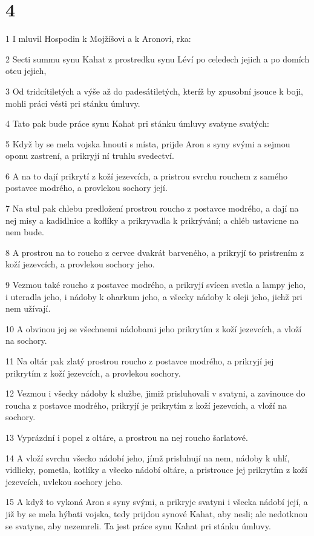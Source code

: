 \chapter{4}

\par 1 I mluvil Hospodin k Mojžíšovi a k Aronovi, rka:
\par 2 Secti summu synu Kahat z prostredku synu Léví po celedech jejich a po domích otcu jejich,
\par 3 Od tridcítiletých a výše až do padesátiletých, kteríž by zpusobní jsouce k boji, mohli práci vésti pri stánku úmluvy.
\par 4 Tato pak bude práce synu Kahat pri stánku úmluvy svatyne svatých:
\par 5 Když by se mela vojska hnouti s místa, prijde Aron s syny svými a sejmou oponu zastrení, a prikryjí ní truhlu svedectví.
\par 6 A na to dají prikrytí z koží jezevcích, a pristrou svrchu rouchem z samého postavce modrého, a provlekou sochory její.
\par 7 Na stul pak chlebu predložení prostrou roucho z postavce modrého, a dají na nej misy a kadidlnice a koflíky a prikryvadla k prikrývání; a chléb ustavicne na nem bude.
\par 8 A prostrou na to roucho z cervce dvakrát barveného, a prikryjí to pristrením z koží jezevcích, a provlekou sochory jeho.
\par 9 Vezmou také roucho z postavce modrého, a prikryjí svícen svetla a lampy jeho, i uteradla jeho, i nádoby k oharkum jeho, a všecky nádoby k oleji jeho, jichž pri nem užívají.
\par 10 A obvinou jej se všechnemi nádobami jeho prikrytím z koží jezevcích, a vloží na sochory.
\par 11 Na oltár pak zlatý prostrou roucho z postavce modrého, a prikryjí jej prikrytím z koží jezevcích, a provlekou sochory.
\par 12 Vezmou i všecky nádoby k službe, jimiž prisluhovali v svatyni, a zavinouce do roucha z postavce modrého, prikryjí je prikrytím z koží jezevcích, a vloží na sochory.
\par 13 Vyprázdní i popel z oltáre, a prostrou na nej roucho šarlatové.
\par 14 A vloží svrchu všecko nádobí jeho, jímž prisluhují na nem, nádoby k uhlí, vidlicky, pometla, kotlíky a všecko nádobí oltáre, a pristrouce jej prikrytím z koží jezevcích, uvlekou sochory jeho.
\par 15 A když to vykoná Aron s syny svými, a prikryje svatyni i všecka nádobí její, a již by se mela hýbati vojska, tedy prijdou synové Kahat, aby nesli; ale nedotknou se svatyne, aby nezemreli. Ta jest práce synu Kahat pri stánku úmluvy.
